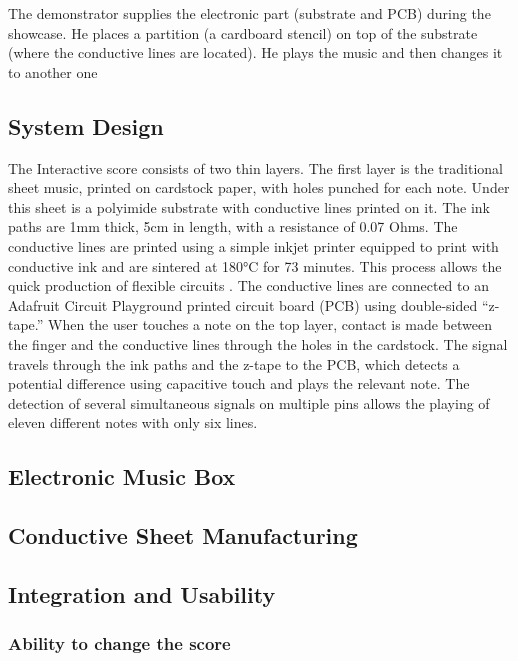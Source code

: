 The demonstrator supplies the electronic part (substrate and PCB) during the
showcase. He places a partition (a cardboard stencil) on top of the substrate (where
the conductive lines are located). He plays the music and then changes it to another
one

\subsection{System Design}

The Interactive score consists of two thin layers. The first layer is the traditional sheet
music, printed on cardstock paper, with holes punched for each note. Under this sheet
is a polyimide substrate with conductive lines printed on it. The ink paths are 1mm
thick, 5cm in length, with a resistance of 0.07 Ohms. The conductive lines are printed
using a simple inkjet printer equipped to print with conductive ink and are sintered at
180°C for 73 minutes. This process allows the quick production of flexible circuits \cite{khan2019soft}.
The conductive lines are connected to an Adafruit Circuit Playground printed circuit
board (PCB) using double-sided “z-tape.”
When the user touches a note on the top layer, contact is made between the finger and
the conductive lines through the holes in the cardstock. The signal travels through the
ink paths and the z-tape to the PCB, which detects a potential difference using
capacitive touch and plays the relevant note. The detection of several simultaneous
signals on multiple pins allows the playing of eleven different notes with only six lines.

\subsection{Electronic Music Box}

\subsection{Conductive Sheet Manufacturing}

\subsection{Integration and Usability}

\subsubsection{Ability to change the score}


